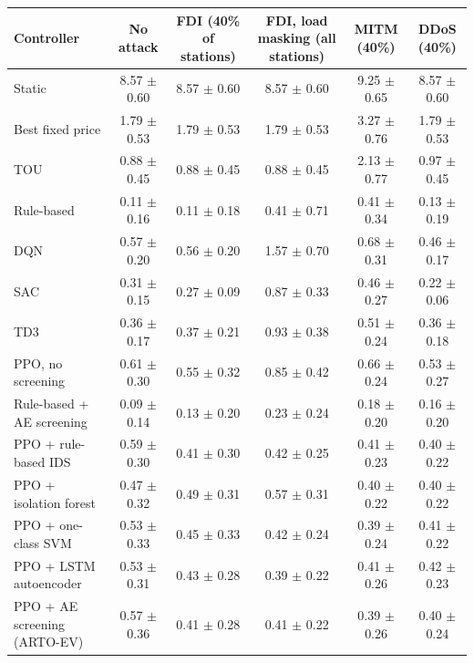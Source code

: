 \begin{tabular}{@{}lccccc@{}}
\toprule
Controller & No attack & FDI (40\% of stations) & FDI, load masking (all stations) & MITM (40\%) & DDoS (40\%) \\
\midrule
Static & 8.57 $\pm$ 0.60 & 8.57 $\pm$ 0.60 & 8.57 $\pm$ 0.60 & 9.25 $\pm$ 0.65 & 8.57 $\pm$ 0.60 \\
Best fixed price & 1.79 $\pm$ 0.53 & 1.79 $\pm$ 0.53 & 1.79 $\pm$ 0.53 & 3.27 $\pm$ 0.76 & 1.79 $\pm$ 0.53 \\
TOU & 0.88 $\pm$ 0.45 & 0.88 $\pm$ 0.45 & 0.88 $\pm$ 0.45 & 2.13 $\pm$ 0.77 & 0.97 $\pm$ 0.45 \\
Rule-based & 0.11 $\pm$ 0.16 & 0.11 $\pm$ 0.18 & 0.41 $\pm$ 0.71 & 0.41 $\pm$ 0.34 & 0.13 $\pm$ 0.19 \\
DQN & 0.57 $\pm$ 0.20 & 0.56 $\pm$ 0.20 & 1.57 $\pm$ 0.70 & 0.68 $\pm$ 0.31 & 0.46 $\pm$ 0.17 \\
SAC & 0.31 $\pm$ 0.15 & 0.27 $\pm$ 0.09 & 0.87 $\pm$ 0.33 & 0.46 $\pm$ 0.27 & 0.22 $\pm$ 0.06 \\
TD3 & 0.36 $\pm$ 0.17 & 0.37 $\pm$ 0.21 & 0.93 $\pm$ 0.38 & 0.51 $\pm$ 0.24 & 0.36 $\pm$ 0.18 \\
PPO, no screening & 0.61 $\pm$ 0.30 & 0.55 $\pm$ 0.32 & 0.85 $\pm$ 0.42 & 0.66 $\pm$ 0.24 & 0.53 $\pm$ 0.27 \\
\midrule
Rule-based + AE screening & 0.09 $\pm$ 0.14 & 0.13 $\pm$ 0.20 & 0.23 $\pm$ 0.24 & 0.18 $\pm$ 0.20 & 0.16 $\pm$ 0.20 \\
PPO + rule-based IDS & 0.59 $\pm$ 0.30 & 0.41 $\pm$ 0.30 & 0.42 $\pm$ 0.25 & 0.41 $\pm$ 0.23 & 0.40 $\pm$ 0.22 \\
PPO + isolation forest & 0.47 $\pm$ 0.32 & 0.49 $\pm$ 0.31 & 0.57 $\pm$ 0.31 & 0.40 $\pm$ 0.22 & 0.40 $\pm$ 0.22 \\
PPO + one-class SVM & 0.53 $\pm$ 0.33 & 0.45 $\pm$ 0.33 & 0.42 $\pm$ 0.24 & 0.39 $\pm$ 0.24 & 0.41 $\pm$ 0.22 \\
PPO + LSTM autoencoder & 0.53 $\pm$ 0.31 & 0.43 $\pm$ 0.28 & 0.39 $\pm$ 0.22 & 0.41 $\pm$ 0.26 & 0.42 $\pm$ 0.23 \\
PPO + AE screening (ARTO-EV) & 0.57 $\pm$ 0.36 & 0.41 $\pm$ 0.28 & 0.41 $\pm$ 0.22 & 0.39 $\pm$ 0.26 & 0.40 $\pm$ 0.24 \\
\bottomrule
\end{tabular}